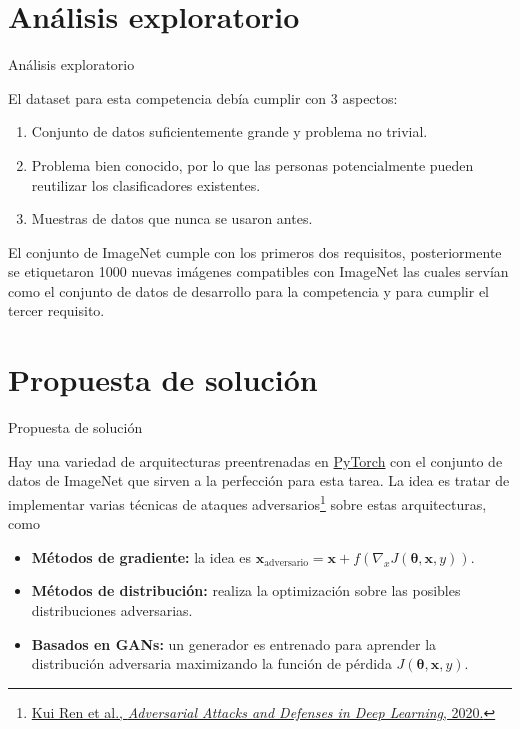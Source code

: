 \documentclass[10pt]{beamer}
\begin{document}
\section{Análisis exploratorio}
\begin{frame}{Análisis exploratorio}
\justify	
\small

El dataset para esta competencia debía cumplir con 3 aspectos:

\begin{enumerate}
\item Conjunto de datos suficientemente grande y problema no trivial.
\item Problema bien conocido, por lo que las personas potencialmente pueden reutilizar los clasificadores existentes.
\item Muestras de datos que nunca se usaron antes.
\end{enumerate}

El conjunto de ImageNet cumple con los primeros dos requisitos, posteriormente se etiquetaron 1000 nuevas imágenes compatibles con ImageNet las cuales servían como el conjunto de datos de desarrollo para la competencia y para cumplir el tercer requisito.

\end{frame}

\section{Propuesta de solución}
\begin{frame}{Propuesta de solución}
\justify	
\small

Hay una variedad de arquitecturas preentrenadas en \href{https://pytorch.org/vision/stable/models.html}{PyTorch} con el conjunto de datos de ImageNet que sirven a la perfección para esta tarea. La idea es tratar de implementar varias técnicas de ataques adversarios\footnote{\vspace*{0.3cm} \href{https://reader.elsevier.com/reader/sd/pii/S209580991930503X?token=D051F74ED28FC5C7871D901893E9DAA76D35478F8C374211EC76DA66B1D71487CCB669164F543A5F3A04AE89239AC6C9&originRegion=us-east-1&originCreation=20210425231353}{Kui Ren et al., \emph{Adversarial Attacks and Defenses in Deep Learning}, 2020.}} sobre estas arquitecturas, como 

\begin{itemize}
\item \textbf{Métodos de gradiente:} la idea es $\bm{x}_{\text{adversario}} = \bm{x} + f(\nabla_{x}J(\bm{\theta}, \bm{x}, y))$.

\item \textbf{Métodos de distribución:} realiza la optimización sobre las posibles distribuciones adversarias.

\item \textbf{Basados en GANs: } un generador es entrenado para aprender la distribución adversaria maximizando la función de pérdida $J(\bm{\theta}, \bm{x}, y)$.
\end{itemize}


\end{frame}
\end{document}
